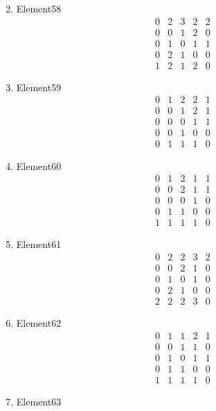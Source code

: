 \documentclass[12pt]{article}
\begin{document}
\begin{multicols}{3}
\begin{enumerate}
\begin{equation*}
\end{equation*}
\item Element58
\begin{equation*}
\begin{array}{ccccc}
0&2&3&2&2\\
0&0&1&2&0\\
0&1&0&1&1\\
0&2&1&0&0\\
1&2&1&2&0
\end{array}
\end{equation*}
\item Element59
\begin{equation*}
\begin{array}{ccccc}
0&1&2&2&1\\
0&0&1&2&1\\
0&0&0&1&1\\
0&0&1&0&0\\
0&1&1&1&0
\end{array}
\end{equation*}
\item Element60
\begin{equation*}
\begin{array}{ccccc}
0&1&2&1&1\\
0&0&2&1&1\\
0&0&0&1&0\\
0&1&1&0&0\\
1&1&1&1&0
\end{array}
\end{equation*}
\item Element61
\begin{equation*}
\begin{array}{ccccc}
0&2&2&3&2\\
0&0&2&1&0\\
0&1&0&1&0\\
0&2&1&0&0\\
2&2&2&3&0
\end{array}
\end{equation*}
\item Element62
\begin{equation*}
\begin{array}{ccccc}
0&1&1&2&1\\
0&0&1&1&0\\
0&1&0&1&1\\
0&1&1&0&0\\
1&1&1&1&0
\end{array}
\end{equation*}
\item Element63

\end{enumerate}
\end{multicols}
\end{document}
